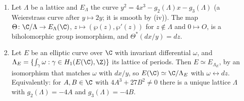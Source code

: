 \begin{theorem}\label{thm:ellcurves:cplxuniform}
\leavevmode
\begin{enumerate}[label=(\roman*)]
\item Let $\Lambda$ be a lattice and $E_\Lambda$ the curve $y^2=4x^3-g_2(\Lambda)x-g_3(\Lambda)$ (a Weierstrass curve after $y\mapsto2y$; it is smooth by (iv)). The
map $\Theta\colon\C/\Lambda\to E_\Lambda(\C)$, $z\mapsto(\wp(z),\wp'(z))$ for $z\notin\Lambda$ and $0\mapsto O$, is a biholomorphic group isomorphism, and $\Theta^*(dx/y)=dz$.
\item Let $E$ be an elliptic curve over $\C$ with invariant differential $\omega$, and $\Lambda_E=\{\int_\gamma\omega:\gamma\in H_1(E(\C),\Z)\}$ its lattice of periods. Then $E\simeq E_{\Lambda_E}$, by
an isomorphism that matches $\omega$ with $dx/y$, so $E(\C)\simeq\C/\Lambda_E$ with $\omega\leftrightarrow dz$. Equivalently: for $A,B\in\C$ with $4A^3+27B^2\ne0$ there is a unique lattice $\Lambda$ with
$g_2(\Lambda)=-4A$ and $g_3(\Lambda)=-4B$.
\end{enumerate}
\end{theorem}

